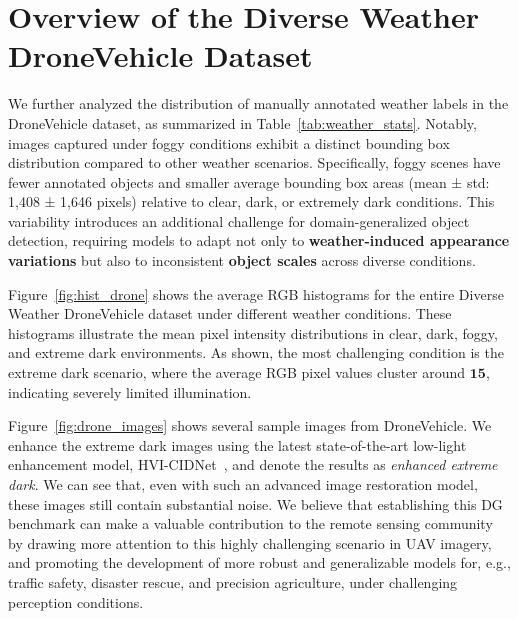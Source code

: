 \documentclass[10pt,twocolumn,letterpaper]{article}
\theoremstyle{plain}
\theoremstyle{definition}
\theoremstyle{remark}
\begin{document}
\section{Overview of the Diverse Weather DroneVehicle Dataset}
We further analyzed the distribution of manually annotated weather labels in the DroneVehicle dataset, as summarized in Table~\ref{tab:weather_stats}. Notably, images captured under foggy conditions exhibit a distinct bounding box distribution compared to other weather scenarios. Specifically, foggy scenes have fewer annotated objects and smaller average bounding box areas (mean ± std: 1,408 ± 1,646 pixels) relative to clear, dark, or extremely dark conditions. This variability introduces an additional challenge for domain-generalized object detection, requiring models to adapt not only to \textbf{weather-induced appearance variations} but also to inconsistent \textbf{object scales} across diverse conditions.

Figure~\ref{fig:hist_drone} shows the average RGB histograms for the entire Diverse Weather DroneVehicle dataset under different weather conditions. These histograms illustrate the mean pixel intensity distributions in clear, dark, foggy, and extreme dark environments. As shown, the most challenging condition is the extreme dark scenario, where the average RGB pixel values cluster around $\mathbf{15}$, indicating severely limited illumination.

Figure~\ref{fig:drone_images} shows several sample images from DroneVehicle. We enhance the extreme dark images using the latest state-of-the-art low-light enhancement model, HVI-CIDNet~\cite{yan2025hvi}, and denote the results as \textit{enhanced extreme dark}. We can see that, even with such an advanced image restoration model, these images still contain substantial noise. We believe that establishing this DG benchmark can make a valuable contribution to the remote sensing community by drawing more attention to this highly challenging scenario in UAV imagery, and promoting the development of more robust and generalizable models for, e.g., traffic safety, disaster rescue, and precision agriculture, under challenging perception conditions.







\end{document}
